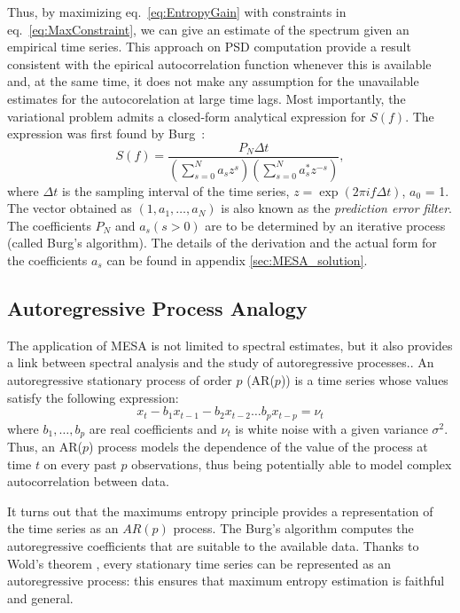 \documentclass[twocolumn,showpacs,preprintnumbers,nofootinbib,prd,
superscriptaddress,10pt]{revtex4-1}
\begin{document}
Thus, by maximizing eq.~\eqref{eq:EntropyGain} with constraints in eq.~\eqref{eq:MaxConstraint}, we can give an estimate of the spectrum given an empirical time series.
This approach on PSD computation provide a result consistent with the epirical autocorrelation function whenever this is available and, at the same time, it does not make any assumption for the unavailable estimates for the autocorelation at large time lags.
Most importantly, the variational problem admits a closed-form analytical expression for $S(f)$.
The expression was first found by Burg~\cite{burg1975maximum}:
\begin{equation}\label{eq:MESApsd}
    S(f) = \frac{P_N \Delta t}{\left(\sum_{s=0}^N a_s z^s\right)\left(\sum_{s = 0}^N a^*_s z^{-s}\right)}, 
\end{equation}
where $\Delta t$ is the sampling interval of the time series, $z=\exp{(2\pi i f\Delta t)}$, $a_0$ = 1.
The vector obtained as $(1, a_1, \dots, a_N)$ is also known as the \textit{prediction error filter}.
The coefficients $P_N$ and $a_s (s > 0)$ are to be determined by an iterative process (called Burg's algorithm). The details of the derivation and the actual form for the coefficients $a_s$ can be found in appendix \ref{sec:MESA_solution}.

\subsection{Autoregressive Process Analogy} \label{sec:autoregr}

The application of MESA is not limited to spectral estimates, but it also provides a link between spectral analysis and the study
of autoregressive processes.\cite{doi:10.1029/RG013i001p00183}.
An autoregressive stationary process of order $p$ (AR($p$)) is a time series whose values satisfy the following expression: 
\begin{equation} \label{eq:AR_p}
    x_t - b_1 x_{t-1} - b_2 x_{t-2} \dots b_p x_{t - p} = \nu_t
\end{equation}
where $b_1, \ldots, b_p$ are real coefficients and $\nu_t$ is white noise with a given variance $\sigma^2$.
Thus, an AR($p$) process models the dependence of the value of the process at time $t$ on every past $p$ observations, 
thus being potentially able to model complex autocorrelation between data.

It turns out that the maximums entropy principle provides a representation of the time series as an $AR(p)$ process. The Burg's algorithm computes the autoregressive coefficients that are suitable to the available data.
Thanks to Wold's theorem \cite{Wold_theorem}, every stationary time series can be represented as an autoregressive process: this ensures that maximum entropy estimation is faithful and general.
\end{document}
